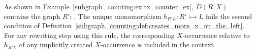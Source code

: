 \begin{example}
    As shown in Example~\ref{subgraph_counting:ex:rx_counter_ex}, \( D(R,X) \) contains the graph $R'$:
    . The unique monomorphism $h_{R'L}:R' \rightarrowtail L$ fails the second condition of Definition~\ref{subgraph_counting:def:creates_more_x_on_the_left}. 
    For any rewriting step using this rule, the corresponding $X$-occurrence relative to $h_{R'L}$ of any implicitly created $X$-occurrence is included in the context.
\end{example}
